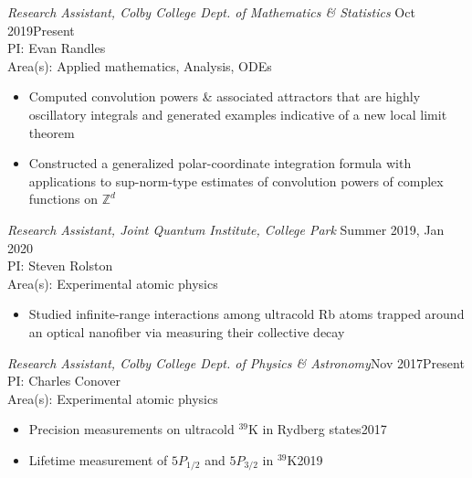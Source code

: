 \documentclass[10pt]{article}
\begin{document}
\noindent \textit{Research Assistant, Colby College Dept. of Mathematics \& Statistics} \hfill Oct 2019\textendash Present\\
PI: Evan Randles  \\ 
Area(s): Applied mathematics, Analysis, ODEs  \vspace{-5pt}
\begin{itemize}
	\setlength\itemsep{-4pt}
	\item Computed convolution powers \& associated attractors that are highly oscillatory integrals and generated examples indicative of a new local limit theorem
	\item Constructed a generalized polar-coordinate integration formula with applications to sup-norm-type estimates of convolution powers of complex functions on $\mathbb{Z}^d$
\end{itemize}


\noindent \textit{Research Assistant, Joint Quantum Institute, College Park} \hfill Summer 2019, Jan 2020  \\
PI:  Steven Rolston\\  %
Area(s): Experimental atomic physics  \vspace{-5pt}
\begin{itemize}
	\setlength\itemsep{-4pt}
	\item Studied infinite-range interactions among ultracold Rb atoms trapped around an optical nanofiber via measuring their collective decay
\end{itemize}





\noindent \textit{Research Assistant, Colby College Dept. of Physics \& Astronomy}\hfill Nov 2017\textendash Present \\
PI: Charles Conover \\ %
Area(s): Experimental atomic physics \vspace{-5pt}
\begin{itemize}
	\setlength\itemsep{-4pt}
	\item Precision measurements on ultracold $^{\text{39}}$K in Rydberg states\hfill 2017 
	\item Lifetime measurement of $5P_{1/2}$ and $5P_{3/2}$ in $^{\text{39}}$K\hfill 2019\textendash
\end{itemize}
\end{document}
